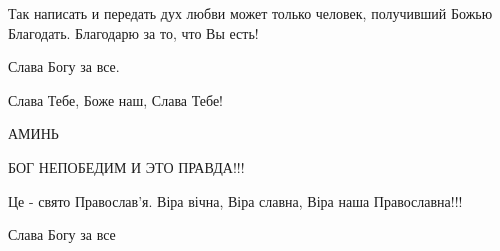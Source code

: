 \begin{itemize}
Так написать и передать дух любви может только человек, получивший Божью Благодать. Благодарю за то, что Вы есть!

 
Слава Богу за все.

 
Слава Тебе, Боже наш, Слава Тебе!🙏🙏🙏🥰

 
АМИНЬ

 
БОГ НЕПОБЕДИМ И ЭТО ПРАВДА!!!

 
Це - свято Православ'я. Віра вічна, Віра славна, Віра наша Православна!!!

 
Слава Богу за все

 

\end{itemize}
